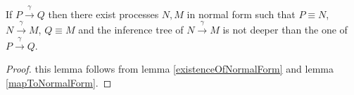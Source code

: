 % 	

\begin{lemma}
  If $P \xrightarrow{\gamma} Q$ then there exist processes $N,M$ in normal form such that $P\equiv N$, $N \xrightarrow{\gamma} M$, $Q\equiv M$ and the inference tree of $N \xrightarrow{\gamma} M$ is not deeper than the one of $P \xrightarrow{\gamma} Q$.
  \begin{proof}
    this lemma follows from lemma \ref{existenceOfNormalForm} and lemma \ref{mapToNormalForm}.
  \end{proof}
\end{lemma}


